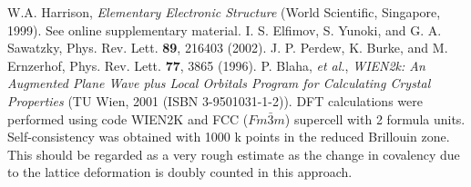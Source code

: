 \documentclass[showpacs,preprintnumbers,amsmath,amssymb,prl,aps,twocolumn,superscriptaddress]{revtex4}
\begin{document}
\begin{thebibliography}{99}
W.A. Harrison, {\it Elementary Electronic Structure} 
(World Scientific, Singapore, 1999).
See online supplementary material.  
I. S. Elfimov, S. Yunoki, and G. A. Sawatzky, Phys. Rev. Lett. {\bf 89}, 
216403 (2002). 
 J. P. Perdew, 
K. Burke, and M. Ernzerhof, Phys. Rev. Lett. {\bf 77}, 3865 (1996).
 P. Blaha, {\it et al.}, {\it WIEN2k: An Augmented Plane 
Wave plus Local Orbitals Program for Calculating Crystal Properties} 
(TU Wien, 2001 (ISBN 3-9501031-1-2)).
 DFT calculations were performed using code
WIEN2K\cite{wien2k} and FCC ($Fm\bar{3}m$) supercell with 2 formula units.
Self-consistency was obtained with 1000 k points in the reduced Brillouin
zone. 
This should be regarded as a very rough estimate as the change in covalency 
due to the lattice deformation is doubly counted in this approach.  
\end{thebibliography}
\end{document}
